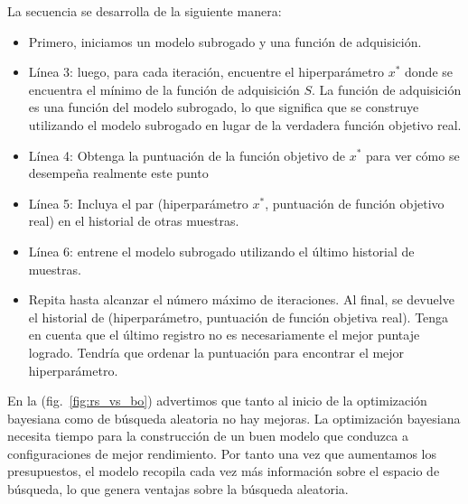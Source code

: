 \documentclass[a4paper,12pt]{article}
\begin{document}
La secuencia se desarrolla de la siguiente manera:
\begin{itemize}[noitemsep, topsep=2pt]
	\item Primero, iniciamos un modelo subrogado y una función de adquisición.
	\item Línea 3: luego, para cada iteración, encuentre el hiperparámetro $x^*$ donde se encuentra el mínimo de la función de adquisición $S$. La función de adquisición es una función del modelo subrogado, lo que significa que se construye utilizando el modelo subrogado en lugar de la verdadera función objetivo real.
	\item Línea 4: Obtenga la puntuación de la función objetivo de $x^*$ para ver cómo se desempeña realmente este punto
	\item Línea 5: Incluya el par (hiperparámetro $x^*$, puntuación de función objetivo real) en el historial de otras muestras.
	\item Línea 6: entrene el modelo subrogado utilizando el último historial de muestras.
	\item Repita hasta alcanzar el número máximo de iteraciones. Al final, se devuelve el historial de (hiperparámetro, puntuación de función objetiva real). Tenga en cuenta que el último registro no es necesariamente el mejor puntaje logrado. Tendría que ordenar la puntuación para encontrar el mejor hiperparámetro.
\end{itemize}

En la (fig.~\ref{fig:rs_vs_bo}) \citep{automl-bohb} advertimos que tanto al inicio de la optimización bayesiana como de búsqueda aleatoria no hay mejoras. La optimización bayesiana necesita tiempo para la construcción de un buen modelo que conduzca a configuraciones de mejor rendimiento. Por tanto una vez que aumentamos los presupuestos, el modelo recopila cada vez más información sobre el espacio de búsqueda, lo que genera ventajas sobre la búsqueda aleatoria.

\end{document}
